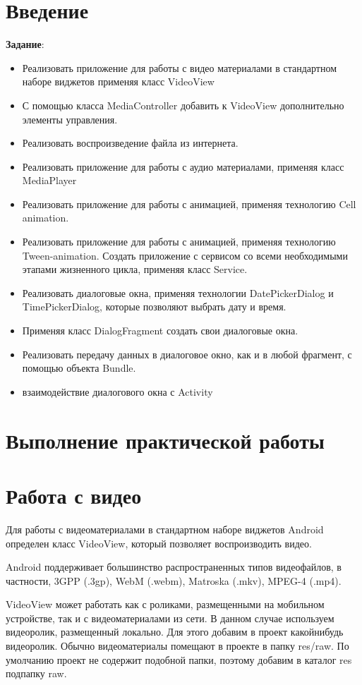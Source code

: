 \graphicspath{{./twelfth/img}}

\section*{\LARGE{Введение}}

\textbf{Задание}:
\begin{itemize}
	\item Реализовать приложение для работы с видео материалами в
		стандартном наборе виджетов применяя класс VideoView
	\item С помощью класса MediaController добавить к VideoView
		дополнительно элементы управления.
	\item Реализовать воспроизведение файла из интернета.
	\item Реализовать приложение для работы с аудио материалами, применяя
		класс MediaPlayer
	\item Реализовать приложение для работы с анимацией, применяя
		технологию Cell animation.
	\item Реализовать приложение для работы с анимацией, применяя
		технологию Tween-animation. Создать приложение с сервисом со
		всеми необходимыми этапами жизненного цикла, применяя класс
		Service.
	\item Реализовать диалоговые окна, применяя технологии DatePickerDialog и
		TimePickerDialog, которые позволяют выбрать дату и время.
	\item Применяя класс DialogFragment создать свои диалоговые окна.
	\item Реализовать передачу данных в диалоговое окно, как и в любой
		фрагмент, с помощью объекта Bundle.
	\item взаимодействие диалогового окна с Activity
\end{itemize}

\clearpage

\section*{\LARGE{Выполнение практической работы}}

\section{Работа с видео}
Для работы с видеоматериалами в стандартном наборе виджетов Android
определен класс VideoView, который позволяет воспроизводить видео.\par
Android поддерживает большинство распространенных типов видеофайлов,
в частности, 3GPP (.3gp), WebM (.webm), Matroska (.mkv), MPEG-4 (.mp4).\par
VideoView может работать как с роликами, размещенными на мобильном
устройстве, так и с видеоматериалами из сети. В данном случае используем
видеоролик, размещенный локально. Для этого добавим в проект какойнибудь видеоролик. Обычно видеоматериалы помещают в проекте в папку
res/raw. По умолчанию проект не содержит подобной папки, поэтому
добавим в каталог res подпапку raw.

